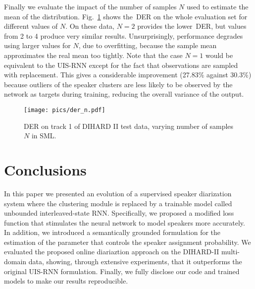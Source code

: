 \documentclass{article}
\begin{document}
Finally we evaluate the impact of the number of samples $N$ used to estimate the mean of the distribution. Fig.~\ref{fig:nsamples} shows the~\ac{DER} on the whole evaluation set for different values of $N$. On these data, $N=2$ provides the lower~\ac{DER}, but values from 2 to 4 produce very similar results. Unsurprisingly, performance degrades using larger values for $N$, due to overfitting, because the sample mean approximates the real mean too tightly. Note that the case $N=1$ would be equivalent to the UIS-RNN except for the fact that observations are sampled with replacement. This gives a considerable improvement (27.83\% against 30.3\%) because outliers of the speaker clusters are less likely to be observed by the network as targets during training, reducing the overall variance of the output. \begin{figure}[!ht]
\centering
  \texttt{[image: pics/der\_n.pdf]}
  \caption{\ac{DER} on track 1 of DIHARD II test data, varying number of samples $N$ in SML.}
  \label{fig:nsamples}
\end{figure}
\section{Conclusions}
\label{sec:conclusions}
In this paper we presented an evolution of a supervised speaker diarization system where the clustering module is replaced by a trainable model called unbounded interleaved-state RNN. Specifically, we proposed a modified loss function that stimulates the neural network to model speakers more accurately. In addition, we introduced a semantically grounded formulation for the estimation of the parameter that controls the speaker assignment probability. We evaluated the proposed online diariaztion approach on the DIHARD-II multi-domain data, showing, through extensive experiments, that it outperforms the original UIS-RNN formulation. Finally, we fully disclose our code and trained models to make our results reproducible.

\newpage


\end{document}

